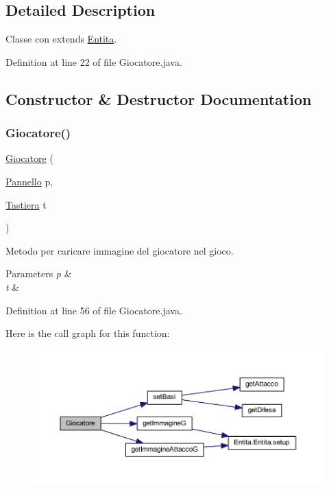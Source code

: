 \subsection{Detailed Description}
Classe con extends \hyperlink{class_entita_1_1_entita}{Entita}. 

Definition at line 22 of file Giocatore.\+java.



\subsection{Constructor \& Destructor Documentation}
\mbox{\label{class_entita_1_1_giocatore_ab9baa50cd99d9d2e399e9e3ad53159c6}} 
\subsubsection{\texorpdfstring{Giocatore()}{Giocatore()}}
{\footnotesize\ttfamily \hyperlink{class_entita_1_1_giocatore}{Giocatore} (\begin{DoxyParamCaption}\item[{\hyperlink{classa_1_1survival_1_1game_1_1_pannello}{Pannello}}]{p,  }\item[{\hyperlink{classa_1_1survival_1_1game_1_1_tastiera}{Tastiera}}]{t }\end{DoxyParamCaption})}



Metodo per caricare immagine del giocatore nel gioco. 


\begin{DoxyParams}{Parameters}
{\em p} & \\
\hline
{\em t} & \\
\hline
\end{DoxyParams}


Definition at line 56 of file Giocatore.\+java.

Here is the call graph for this function\+:
\nopagebreak
\begin{figure}[H]
\begin{center}
\leavevmode
\includegraphics[width=350pt]{class_entita_1_1_giocatore_ab9baa50cd99d9d2e399e9e3ad53159c6_cgraph}
\end{center}
\end{figure}


